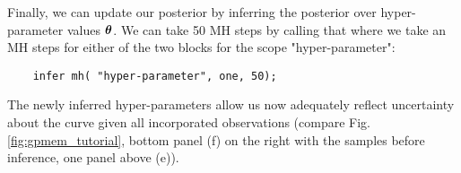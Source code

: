 Finally, we can update our posterior by inferring the posterior over hyper-parameter values $\bm{\theta}$.
We can take 50 \ac{MH} steps by calling that where we take an \ac{MH} steps for either of the two blocks for the scope "hyper-parameter": 
   \begin{lstlisting}
    infer mh( "hyper-parameter", one, 50);
    \end{lstlisting}
The newly inferred hyper-parameters allow us now adequately reflect uncertainty
about the curve given all incorporated observations (compare
Fig. \ref{fig:gpmem_tutorial}, bottom panel (f) on  the right with the samples
before inference, one panel above (e)).
